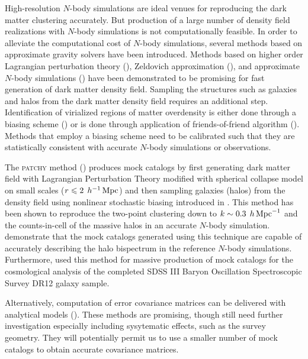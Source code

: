 \documentclass[english,usenatbib]{mn2e}
\newcommand{\mperh}{\,h^{-1}\,{\rm Mpc}}
\newcommand{\hperm}{\,h\,{\rm Mpc}^{-1}}
\begin{document}
High-resolution $N$-body simulations are ideal venues for reproducing the dark matter clustering accurately. But production of a large number of density field realizations with $N$-body simulations is not computationally feasible. In order to alleviate the computational cost of $N$-body simulations, several methods based on approximate gravity solvers have been introduced. Methods based on higher order Lagrangian perturbation theory (\citealt{buchert1993,bouchet1995,catelan1995,monaco2002,scocci2002,alpt}), Zeldovich approximation (\citealt{eazymock}), and approximate $N$-body simulations (\citealt{cola2013,qpm,howlet2015,cola,fastpm,ice_cola,koda}) have been demonstrated to be promising for fast generation of dark matter density field. Sampling the structures such as galaxies and halos from the dark matter density field requires an additional step. Identification of virialized regions of matter overdensity is either done through a biasing scheme (\citealt{kitaura2014,qpm}) or is done through application of friends-of-friend algorithm (\citealt{pthalo,koda,fastpm}). Methods that employ a biasing scheme need to be calibrated such that they are statistically consistent with accurate $N$-body simulations or observations. 

The \textsc{patchy} method (\citealt{kitaura2014,kitaura2015}) produces mock catalogs by first generating dark matter field with Lagrangian Perturbation Theory modified with spherical collapse model on small scales ($r \leq 2 \; \mperh$) and then sampling galaxies (halos) from the density field using nonlinear stochastic biasing introduced in \citet{kitaura2014}. This method has been shown to reproduce the two-point clustering down to $k \sim 0.3 \; \hperm$ and the counts-in-cell of the massive halos in an accurate $N$-body simulation. \citet{kitaura2015} demonstrate that the mock catalogs generated using this technique are capable of accurately describing the halo bispectrum in the reference $N$-body simulations. Furthermore, \citet{kitaura2016} used this method for massive production of mock catalogs for the cosmological analysis of the completed SDSS III Baryon Oscillation Spectroscopic Survey DR12 galaxy sample. 

Alternatively, computation of error covariance matrices can be delivered with analytical models (\citealt{feldman1994,smith2008,crocce2011,sun2013,grieb2016,klaus2016}). 
These methods are promising, though still need further investigation especially including sysytematic effects, such as the survey geometry. They will potentially permit us to use a smaller number of mock catalogs to obtain accurate covariance matrices.
\end{document}
